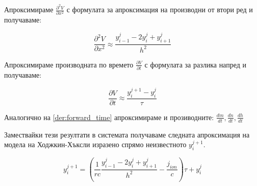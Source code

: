 \documentclass{article}
\begin{document}
    Апроксимираме $\frac{\partial^2 V}{\partial x^2}$ с формулата за апроксимация на производни от втори ред и получаваме:

    \begin{equation}\label{der:mid_space}
        \frac{\partial^2 V}{\partial x^2} \approx \frac{y_{i-1}^j - 2y_i^j + y_{i+1}^j}{h^2}
    \end{equation}
    
    Апроксимираме производната по времето $\frac{\partial V}{\partial t}$ с формулата за разлика напред и получаваме:

    \begin{equation}\label{der:forward_time}
        \frac{\partial V}{\partial t} \approx \frac{y_i^{j+1} - y_i^j}{\tau}
    \end{equation}

    Аналогично на \eqref{der:forward_time} апроксимираме и прозиводните: $\frac{dm}{dt}, \frac{dn}{dt}, \frac{dh}{dt}$

    Замествайки тези резултати в системата получаваме следната апроксимация на модела на Ходжкин-Хъксли изразено спрямо неизвестното
    $y_i^{j+1}$.

    \begin{equation}
        y_i^{j+1} = \left(\frac{1}{rc}\frac{y_{i-1}^j - 2y_i^j + y_{i+1}^j}{h^2} - \frac{j_{ion}}{c}\right)\tau + y_i^j
    \end{equation}
\end{document}
